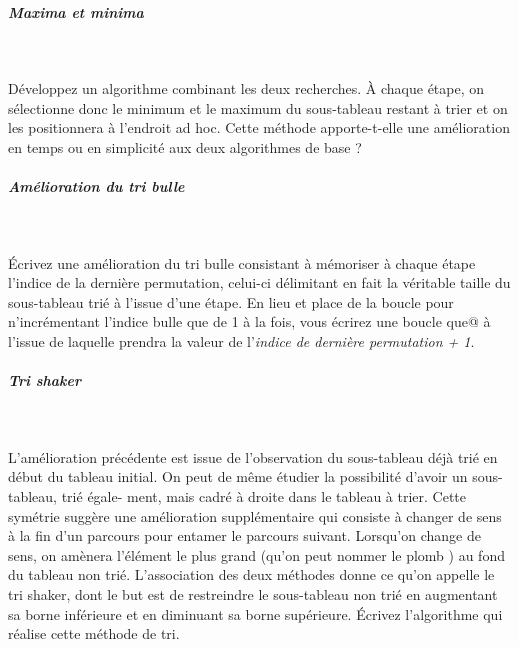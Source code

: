 \documentclass[11pt,a4paper]{article}
\begin{document}
            \par
        
			
		\subparagraph{Maxima et minima} 
		
					\textcolor{white}{.} \par
				
        D\'eveloppez un algorithme combinant les deux recherches. \`A chaque \'etape, on s\'electionne
        donc le minimum et le maximum du sous-tableau restant \`a trier et on les positionnera \`a
        l'endroit ad hoc. Cette m\'ethode apporte-t-elle une am\'elioration en temps ou en simplicit\'e
        aux deux algorithmes de base ?
      
            \par
        
			
		\subparagraph{Am\'elioration du tri bulle} 
		
					\textcolor{white}{.} \par
				
        \'Ecrivez une am\'elioration du tri bulle consistant \`a m\'emoriser \`a chaque \'etape l'indice de la
        derni\`ere permutation, celui-ci d\'elimitant en fait la v\'eritable taille du sous-tableau tri\'e \`a
        l'issue d'une \'etape. En lieu et place de la boucle pour n'incr\'ementant l'indice bulle que de 1
        \`a la fois, vous \'ecrirez une boucle \verb@tant que@ 
        \`a l'issue de laquelle \verb@indiceBulle@ prendra la valeur de
        l'\textit{indice de derni\`ere permutation + 1}.
      
            \par
        
			
		\subparagraph{Tri shaker} 
		
					\textcolor{white}{.} \par
				
        L'am\'elioration pr\'ec\'edente est issue de l'observation du sous-tableau d\'ej\`a tri\'e en d\'ebut du
        tableau initial. On peut de m\^eme \'etudier la possibilit\'e d'avoir un sous-tableau, tri\'e \'egale-
        ment, mais cadr\'e \`a droite dans le tableau \`a trier. Cette sym\'etrie sugg\`ere une am\'elioration
        suppl\'ementaire qui consiste \`a changer de sens \`a la fin d'un parcours pour entamer le parcours
        suivant. Lorsqu'on change de sens, on am\`enera l'\'el\'ement le plus grand (qu'on peut nommer
        le \guillemotleft  plomb \guillemotright ) au fond du tableau non tri\'e. L'association des deux m\'ethodes donne ce qu'on
        appelle le tri shaker, dont le but est de restreindre le sous-tableau non tri\'e en augmentant
        sa borne inf\'erieure et en diminuant sa borne sup\'erieure. \'Ecrivez l'algorithme qui r\'ealise cette
        m\'ethode de tri.
      
            \par
        
				
\end{document}
